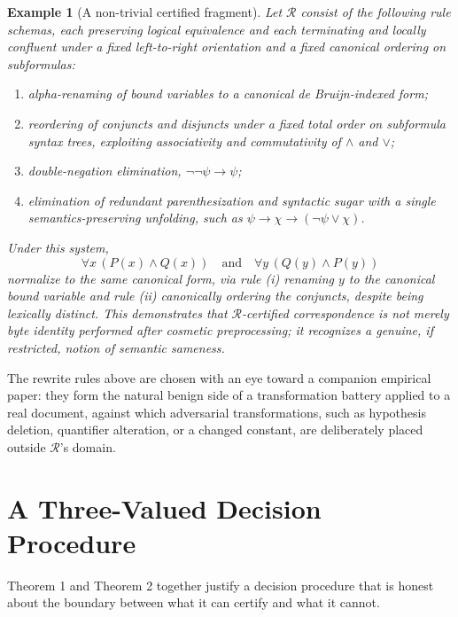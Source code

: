 \documentclass[11pt]{article}
\newtheorem{example}{Example}
\begin{document}
\begin{example}[A non-trivial certified fragment]
Let $\mathcal{R}$ consist of the following rule schemas, each preserving logical equivalence and each terminating and locally confluent under a fixed left-to-right orientation and a fixed canonical ordering on subformulas:
\begin{enumerate}
\item[(i)] alpha-renaming of bound variables to a canonical de Bruijn-indexed form;
\item[(ii)] reordering of conjuncts and disjuncts under a fixed total order on subformula syntax trees, exploiting associativity and commutativity of $\wedge$ and $\vee$;
\item[(iii)] double-negation elimination, $\neg\neg\psi \to \psi$;
\item[(iv)] elimination of redundant parenthesization and syntactic sugar with a single semantics-preserving unfolding, such as $\psi \rightarrow \chi \to (\neg \psi \vee \chi)$.
\end{enumerate}
Under this system,
\[
\forall x\,(P(x) \wedge Q(x)) \quad \text{and} \quad \forall y\,(Q(y) \wedge P(y))
\]
normalize to the same canonical form, via rule (i) renaming $y$ to the canonical bound variable and rule (ii) canonically ordering the conjuncts, despite being lexically distinct. This demonstrates that $\mathcal{R}$-certified correspondence is not merely byte identity performed after cosmetic preprocessing; it recognizes a genuine, if restricted, notion of semantic sameness.
\end{example}

The rewrite rules above are chosen with an eye toward a companion empirical paper: they form the natural benign side of a transformation battery applied to a real document, against which adversarial transformations, such as hypothesis deletion, quantifier alteration, or a changed constant, are deliberately placed outside $\mathcal{R}$'s domain.

\section{A Three-Valued Decision Procedure}

Theorem 1 and Theorem 2 together justify a decision procedure that is honest about the boundary between what it can certify and what it cannot.
\end{document}
